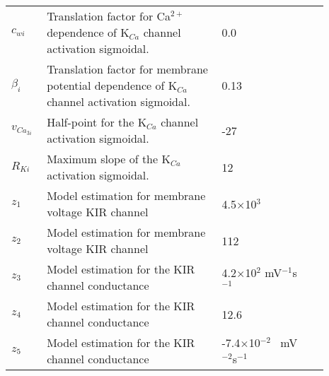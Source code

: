 \begin{table}[h!]
\centering
\begin{tabular}{ p{0.09\linewidth}  >{\footnotesize} p{0.5\linewidth}  >{\footnotesize} p{0.27\linewidth} >{\footnotesize} p{0.03\linewidth} }
\hline
$c_{wi}$      			& Translation factor for Ca$^{2+}$ dependence of K$_{Ca}$ channel activation sigmoidal.	& 0.0  \uM	&\cite{Koenigsberger2006} \\
$\beta_{i}$     		& Translation factor for membrane potential dependence of K$_{Ca}$ channel activation sigmoidal.	& 0.13 \uMtwee& \cite{Koenigsberger2006} \\
$v_{Ca_{3i}}$   		& Half-point for the K$_{Ca}$ channel activation sigmoidal.			& -27 \mV	&\cite{Koenigsberger2006} \\
$R_{Ki}$      			& Maximum slope of the K$_{Ca}$ activation sigmoidal.				& 12 \mV	&\cite{Koenigsberger2006} \\
  $ z_1 $	& Model estimation for membrane voltage KIR channel			  & 4.5$\times$10$^3$ \mVpuM & \citep{Filosa2006}\\
  $ z_2 $	& Model estimation for membrane voltage KIR channel			  & 112	 \mV & \citep{Filosa2006}\\
  $ z_3 $	& Model estimation for the KIR channel conductance			  & 4.2$\times$10$^2$ mV$^{-1}$s$^{-1}$ & \citep{Filosa2006}\\
  $ z_4 $	& Model estimation for the KIR channel conductance			  & 12.6			 \uMpmVs & \citep{Filosa2006}\\
  $ z_5 $	& Model estimation for the KIR channel conductance			  & -7.4$\times$10$^{-2}$		 \uM~mV$^{-2}$s$^{-1}$  & \citep{Filosa2006}\\
  \hline
\end{tabular}
\label{tab:Addeq}
\end{table}
\\
%
